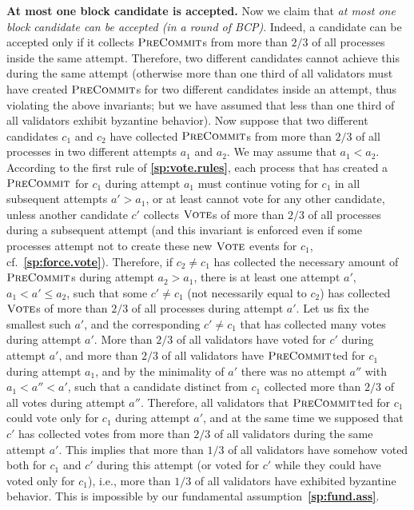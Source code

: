 \documentclass[12pt,oneside]{article}
\def\makepoint#1{\medbreak\noindent{\bf #1.\ }}
\def\nxsubpoint{\refstepcounter{subsubsection}%
  \smallbreak\makepoint{\thesubsubsection}}
\def\refpoint#1{{\rm\textbf{\ref{#1}}}}
\let\ptref=\refpoint
\def\emb#1{\textbf{#1.}}
\def\opsc#1{\operatorname{\textsc{#1}}}
\def\PreCommit{\opsc{PreCommit}}
\def\Vote{\opsc{Vote}}
\begin{document}
\nxsubpoint\emb{At most one block candidate is accepted}\label{sp:acc.unique}
Now we claim that {\em at most one block candidate can be accepted (in a round of BCP)}. Indeed, a candidate can be accepted only if it collects $\PreCommit$s from more than $2/3$ of all processes inside the same attempt. Therefore, two different candidates cannot achieve this during the same attempt (otherwise more than one third of all validators must have created $\PreCommit$s for two different candidates inside an attempt, thus violating the above invariants; but we have assumed that less than one third of all validators exhibit byzantine behavior). Now suppose that two different candidates $c_1$ and $c_2$ have collected $\PreCommit$s from more than $2/3$ of all processes in two different attempts $a_1$ and $a_2$. We may assume that $a_1<a_2$. According to the first rule of \ptref{sp:vote.rules}, each process that has created a $\PreCommit$ for $c_1$ during attempt $a_1$ must continue voting for $c_1$ in all subsequent attempts $a'>a_1$, or at least cannot vote for any other candidate, unless another candidate $c'$ collects $\Vote$s of more than $2/3$ of all processes during a subsequent attempt (and this invariant is enforced even if some processes attempt not to create these new $\Vote$ events for $c_1$, cf.~\ptref{sp:force.vote}). Therefore, if $c_2\neq c_1$ has collected the necessary amount of $\PreCommit$s during attempt $a_2>a_1$, there is at least one attempt $a'$, $a_1<a'\leq a_2$, such that some $c'\neq c_1$ (not necessarily equal to $c_2$) has collected $\Vote$s of more than $2/3$ of all processes during attempt $a'$. Let us fix the smallest such $a'$, and the corresponding $c'\neq c_1$ that has collected many votes during attempt $a'$. More than $2/3$ of all validators have voted for $c'$ during attempt $a'$, and more than $2/3$ of all validators have $\PreCommit$ted for $c_1$ during attempt $a_1$, and by the minimality of $a'$ there was no attempt $a''$ with $a_1<a''<a'$, such that a candidate distinct from $c_1$ collected more than $2/3$ of all votes during attempt $a''$. Therefore, all validators that $\PreCommit$ted for $c_1$ could vote only for $c_1$ during attempt $a'$, and at the same time we supposed that $c'$ has collected votes from more than $2/3$ of all validators during the same attempt $a'$. This implies that more than $1/3$ of all validators have somehow voted both for $c_1$ and $c'$ during this attempt (or voted for $c'$ while they could have voted only for $c_1$), i.e., more than $1/3$ of all validators have exhibited byzantine behavior. This is impossible by our fundamental assumption~\ptref{sp:fund.ass}.
\end{document}

